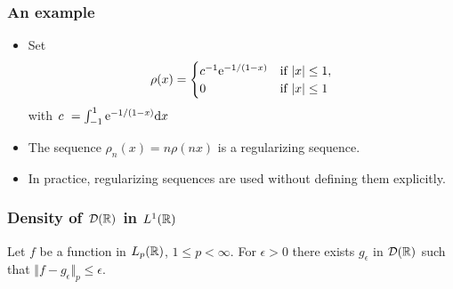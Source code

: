 \begin{frame}
\frametitle{An example}
\begin{itemize}
\item Set 
$$\rho(x)=
\begin{cases}
c^{-1} \mathrm{e}^{-1/(1-x)} &  \text{if $|x|\leq 1$},\\
0 & \text{if $|x|\leq 1$}
\end{cases}
$$
with $c\ =\int_{-1}^{1} \mathrm{e}^{-1/(1-x)} \mathrm{d} x$
\item The sequence $\rho_{n}(x)=n\rho(nx)$ is a \alert{regularizing sequence}. 
\item In practice, regularizing sequences are used without defining them explicitly.
\end{itemize}
\end{frame}

\begin{frame}
\frametitle{Density of $\mathcal{D}(\mathbb{R})$ in $L^{1}(\mathbb{R})$}
\begin{theorem}
Let $f$ be a function in $L_{p}(\mathbb{R})$, $1 \leq p < \infty$. For $\epsilon>0$ there exists $g_\epsilon$ in $\mathcal{D}(\mathbb{R})$ such that $\Vert f-g_{\epsilon}\Vert_{p}\leq\epsilon$.
\end{theorem}
\end{frame}



